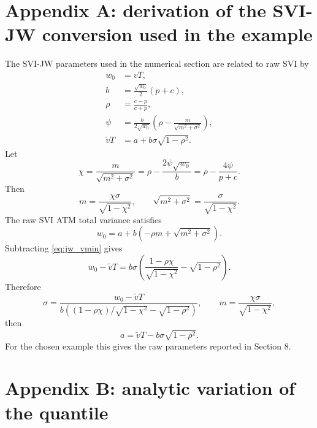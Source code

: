 \documentclass[11pt]{article}
\newcommand{\1}{\mathbf{1}}
\begin{document}
\appendix
\newpage
\section{Appendix A: derivation of the SVI-JW conversion used in the example}

The SVI-JW parameters used in the numerical section are related to raw SVI by
\begin{align}
    w_0&=vT,\label{eq:jw_w0}\\
    b&=\frac{\sqrt{w_0}}{2}(p+c),\label{eq:jw_b}\\
    \rho&=\frac{c-p}{c+p},\label{eq:jw_rho}\\
    \psi&=\frac{b}{2\sqrt{w_0}}\left(\rho-\frac{m}{\sqrt{m^2+\sigma^2}}\right),\label{eq:jw_psi}\\
    \widetilde vT&=a+b\sigma\sqrt{1-\rho^2}.\label{eq:jw_vmin}
\end{align}
Let
\begin{equation}
    \chi=\frac{m}{\sqrt{m^2+\sigma^2}}=\rho-\frac{2\psi\sqrt{w_0}}{b}
    =\rho-\frac{4\psi}{p+c}.\label{eq:chi}
\end{equation}
Then
\begin{equation}
    m=\frac{\chi\sigma}{\sqrt{1-\chi^2}},
    \qquad
    \sqrt{m^2+\sigma^2}=\frac{\sigma}{\sqrt{1-\chi^2}}.
\end{equation}
The raw SVI ATM total variance satisfies
\begin{equation}
    w_0=a+b\left(-\rho m+\sqrt{m^2+\sigma^2}\right).
\end{equation}
Subtracting \eqref{eq:jw_vmin} gives
\begin{equation}
    w_0-\widetilde vT
    =b\sigma\left(
    \frac{1-\rho\chi}{\sqrt{1-\chi^2}}-\sqrt{1-\rho^2}
    \right).\label{eq:sigma_solve}
\end{equation}
Therefore
\begin{equation}
    \sigma=\frac{w_0-\widetilde vT}{b\left((1-\rho\chi)/\sqrt{1-\chi^2}-\sqrt{1-\rho^2}\right)},
    \qquad
    m=\frac{\chi\sigma}{\sqrt{1-\chi^2}},
\end{equation}
then
\begin{equation}
    a=\widetilde vT-b\sigma\sqrt{1-\rho^2}.
\end{equation}
For the chosen example this gives the raw parameters reported in Section 8.

\section{Appendix B: analytic variation of the quantile}
\end{document}
